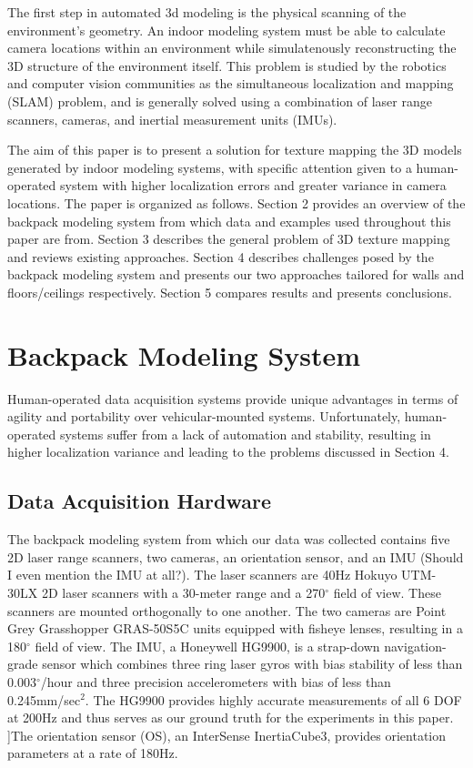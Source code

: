 \documentclass[10pt,twocolumn,letterpaper]{article}
\begin{document}
The first step in automated 3d modeling is the physical scanning of
the environment's geometry. An indoor modeling system must be able to
calculate camera locations within an environment while simulatenously
reconstructing the 3D structure of the environment itself. This
problem is studied by the robotics and computer vision communities as
the simultaneous localization and mapping (SLAM) problem, and is
generally solved using a combination of laser range scanners, cameras,
and inertial measurement units (IMUs).

The aim of this paper is to present a solution for texture mapping the
3D models generated by indoor modeling systems, with specific
attention given to a human-operated system with higher localization
errors and greater variance in camera locations. The paper is
organized as follows. Section 2 provides an overview of the backpack
modeling system from which data and examples used throughout this
paper are from. Section 3 describes the general problem of 3D texture
mapping and reviews existing approaches. Section 4 describes
challenges posed by the backpack modeling system and presents our two
approaches tailored for walls and floors/ceilings
respectively. Section 5 compares results and presents conclusions.

\section{Backpack Modeling System}
Human-operated data acquisition systems provide unique advantages in terms of agility and portability over vehicular-mounted systems. Unfortunately, human-operated systems suffer from a lack of automation and stability, resulting in higher localization variance and leading to the problems discussed in Section 4.

\subsection{Data Acquisition Hardware}
The backpack modeling system from which our data was collected contains five 2D laser range scanners, two cameras, an orientation sensor, and an IMU (Should I even mention the IMU at all?). The laser scanners are 40Hz Hokuyo UTM-30LX 2D laser scanners with a 30-meter range and a 270$^{\circ}$ field of view. These scanners are mounted orthogonally to one another. The two cameras are Point Grey Grasshopper GRAS-50S5C units equipped with fisheye lenses, resulting in a 180$^{\circ}$ field of view. The IMU, a Honeywell HG9900, is a strap-down navigation-grade sensor which combines three ring laser gyros with bias stability of less than 0.003$^{\circ}$/hour and three precision accelerometers with bias of less than 0.245mm/sec$^{2}$. The HG9900 provides highly accurate measurements of all 6 DOF at 200Hz and thus serves as our ground truth for the experiments in this paper. ]The orientation sensor (OS), an InterSense InertiaCube3, provides orientation parameters at a rate of 180Hz.
\end{document}
